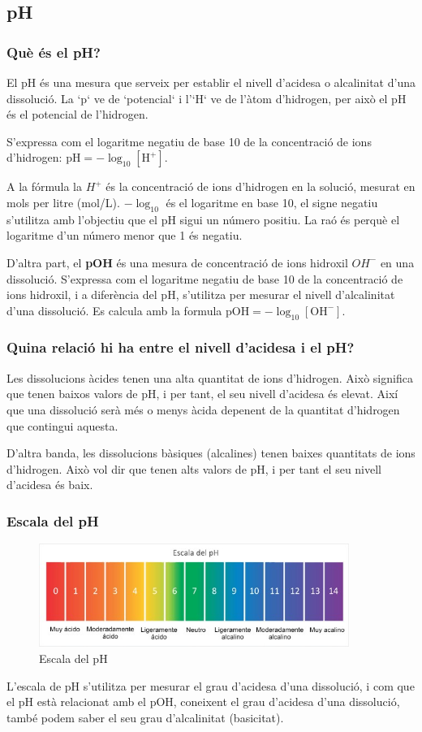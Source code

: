 \subsection{pH} \label{subsec:ph}
\subsubsection{Què és el pH?}
El pH és una mesura que serveix per establir el nivell d’acidesa o alcalinitat d'una dissolució. La `p` ve de `potencial` i l'`H` ve de l’àtom d’hidrogen, per això el pH és el potencial de l’hidrogen.

S'expressa com el logaritme negatiu de base 10 de la concentració de ions d'hidrogen: $ \text{pH} = -\log_{10} [\mathrm{H}^+] $.

A la fórmula la ${H}^+$ és la concentració de ions d'hidrogen en la solució, mesurat en mols per litre (mol/L). $-\log_{10}$ és el logaritme en base 10, el signe negatiu s'utilitza amb l'objectiu que el pH sigui un número positiu. La raó és perquè el logaritme d'un número menor que 1 és negatiu.

D'altra part, el \textbf{pOH} és una mesura de concentració de ions hidroxil ${OH}^-$ en una dissolució. S'expressa com el logaritme negatiu de base 10 de la concentració de ions hidroxil, i a diferència del pH, s'utilitza per mesurar el nivell d’alcalinitat d'una dissolució. Es calcula amb la formula  $ \text{pOH} = -\log_{10} [\mathrm{OH}^-] $.
\subsubsection{ Quina relació hi ha entre el nivell d'acidesa i el pH?}
Les dissolucions àcides tenen una alta quantitat de ions d'hidrogen. Això significa que tenen baixos valors de pH, i per tant, el seu nivell d'acidesa és elevat. Així que una dissolució serà més o menys àcida depenent de la quantitat d'hidrogen que contingui aquesta.

D'altra banda, les dissolucions bàsiques (alcalines) tenen baixes quantitats de ions d'hidrogen. Això vol dir que tenen alts valors de pH, i per tant el seu nivell d'acidesa és baix.
\subsubsection{Escala del pH}
\begin{figure}[h!]
\centering
\includegraphics[width=0.9\textwidth]{./Figures/EscaladepH.png}
\caption{Escala del pH}
\label{fig:escaladeph}
\end{figure}
L'escala de pH s'utilitza per mesurar el grau d'acidesa d'una dissolució, i com que el pH està relacionat amb el pOH, coneixent el grau d'acidesa d'una dissolució, també podem saber el seu grau d'alcalinitat (basicitat).

